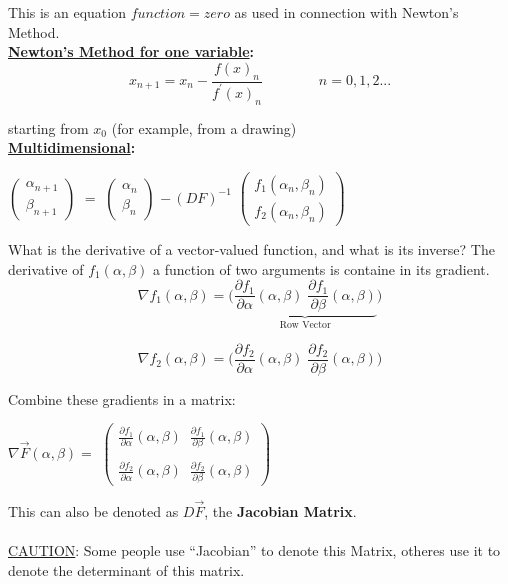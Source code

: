 \documentclass[a4paper,12pt]{report}
\begin{document}
	\noindent This is an equation \textbf{$function = zero$} as used in connection with Newton's Method.\\
	
	\textbf{\underline{Newton's Method for one variable}:}
	$$ x_{n+1} =  x_n - \frac{f(x)_n}{f^\prime(x)_n} \qquad \qquad n = 0, 1, 2...$$
	
	\noindent starting from $x_0$ (for example, from a drawing)\\
	
	\textbf{\underline{Multidimensional}:}
	\begin{center}
	$
	\begin{pmatrix}
    	\alpha_{n+1}\\
    	\beta_{n+1}
	\end{pmatrix}
	$
	$=$
	$
	\begin{pmatrix}
    	\alpha_n\\
    	\beta_n
	\end{pmatrix}	
	$
	$- \,(DF)^{-1}\!\!$
	$
	\begin{pmatrix}
    	f_1(\alpha_n, \beta_n)\\
    	f_2(\alpha_n, \beta_n)
	\end{pmatrix}
	$
	\end{center}
	\vspace{5mm}
	\noindent What is the derivative of a vector-valued function, and what is its inverse?
	The derivative of $f_1(\alpha, \beta)$ a function of two arguments is containe in its gradient.\\
	
	$$ \nabla f_1(\alpha,\beta) = \Big( \underbrace{\frac{\partial f_1}{\partial \alpha}(\alpha, \beta)\;
	\frac{\partial f_1}{\partial \beta}(\alpha, \beta)}_{\text{Row Vector}}\Big)$$
	
	$$ \nabla f_2(\alpha,\beta) = \Big( \frac{\partial f_2}{\partial \alpha}(\alpha, \beta)\;
	\frac{\partial f_2}{\partial \beta}(\alpha, \beta)\Big)$$


	\noindent Combine these gradients in a matrix:
	\large
	\begin{center}
	$\nabla \vec{F}(\alpha, \beta) =$
	$
	\begin{pmatrix}
    	\frac{\partial f_1}{\partial \alpha}(\alpha, \beta)\;\; \frac{\partial f_1}{\partial \beta}(\alpha, \beta)\\ \\
 	\frac{\partial f_2}{\partial \alpha}(\alpha, \beta)\;\; \frac{\partial f_2}{\partial \beta}(\alpha, \beta)
	\end{pmatrix}
	$
	\end{center}
	\normalsize
	\noindent This can also be denoted as $D\vec{F}$, the \textbf{Jacobian Matrix}.\\ \\
	\underline{CAUTION}: Some people use ``Jacobian'' to denote this Matrix, otheres use it to denote the determinant
	of this matrix.\\
	
\end{document}
